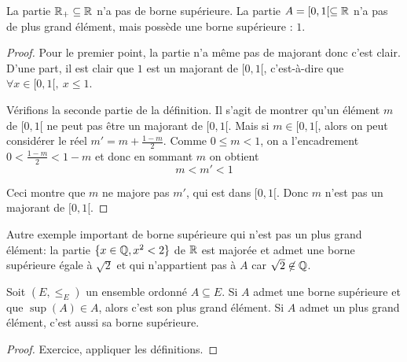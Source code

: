 \begin{exemple}
La partie $\mathbb{R}_+ \subseteq \mathbb{R}$ n'a pas de borne supérieure. 
La partie $A=[0,1[ \subseteq \mathbb{R}$ n'a pas de plus grand élément, mais possède une borne supérieure : $1$.
\end{exemple}
\begin{proof} Pour le premier point, la partie n'a même pas de majorant donc c'est clair. 
D'une part, il est clair que $1$ est un majorant de $[0,1[$, c'est-à-dire que $\forall x\in [0,1[, \: x\leq 1$.

Vérifions la seconde partie de la définition.  Il s'agit de montrer qu'un élément $m$ de $[0,1[$ ne peut pas être un majorant de $[0,1[$. Mais si $m \in [0,1[$, alors on peut considérer le réel $m'=m+\frac{1-m}{2}$. Comme $0\leq m< 1$, on a l'encadrement $0< \frac{1-m}{2} < 1-m$ et donc en sommant $m$ on obtient
\[
m< m' < 1
\]
\begin{center}
\end{center}
Ceci montre que $m$ ne majore pas $m'$, qui est dans $[0,1[$. Donc $m$ n'est pas un majorant de $[0,1[$.
\end{proof}

Autre exemple important de borne supérieure qui n'est pas un plus grand élément: la partie $\{x\in \mathbb{Q}, x^2<2\}$ de $\mathbb{R}$ est majorée et admet une borne supérieure égale à $\sqrt 2$ et qui n'appartient pas à $A$ car $\sqrt2\not\in \mathbb{Q}$. 

\begin{proposition}
Soit $(E,\leq_E)$ un ensemble ordonné $A\subseteq E$.
Si $A$ admet une borne supérieure et que $\sup(A) \in A$, alors c'est son plus grand élément.
Si $A$ admet un plus grand élément, c'est aussi sa borne supérieure.
\end{proposition}
\begin{proof}
Exercice, appliquer les définitions.
\end{proof}

